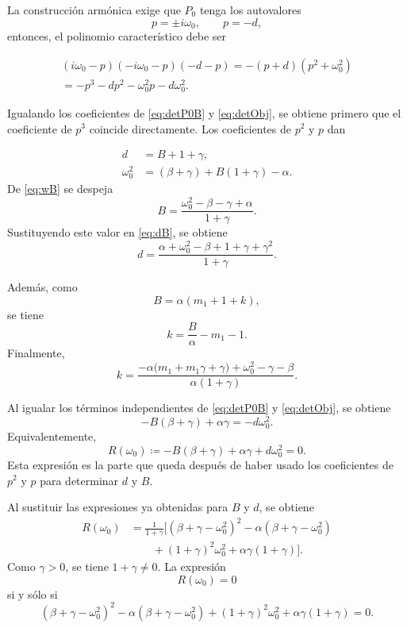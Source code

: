 \documentclass[journal]{IEEEtran}
\begin{document}
\noindent La construcción armónica exige que \(P_0\) tenga los autovalores
\[
p=\pm i\omega_0,\qquad p=-d,
\]
entonces, el polinomio característico debe ser

\begin{eqnarray}
(i\omega_0-p)(-i \omega_0 -p)(-d-p)=-(p+d)(p^2+\omega_0^2)\\
=-p^3-dp^2-\omega_0^2p-d\omega_0^2.
\label{eq:detObj}
\end{eqnarray}

\noindent Igualando los coeficientes de \eqref{eq:detP0B} y \eqref{eq:detObj}, se obtiene primero que el coeficiente de \(p^3\) coincide directamente. Los coeficientes de \(p^2\) y \(p\) dan

\begin{align}
d&=B+1+\gamma, \label{eq:dB}\\
\omega_0^2&=(\beta+\gamma)+B(1+\gamma)-\alpha. \label{eq:wB}
\end{align}
De \eqref{eq:wB} se despeja
\[
B=
\frac{\omega_0^2-\beta-\gamma+\alpha}{1+\gamma}.
\]
Sustituyendo este valor en \eqref{eq:dB}, se obtiene
\begin{equation}
d=
\frac{\alpha+\omega_0^2-\beta+1+\gamma+\gamma^2}{1+\gamma}.
\end{equation}

Además, como
\[
B=\alpha(m_1+1+k),
\]
se tiene
\[
k=\frac{B}{\alpha}-m_1-1.
\]
Finalmente,
\begin{equation}
k=
\frac{-\alpha\bigl(m_1+m_1\gamma+\gamma\bigr)
+\omega_0^2-\gamma-\beta}{\alpha(1+\gamma)}.
\end{equation}

\noindent Al igualar los términos independientes de \eqref{eq:detP0B} y \eqref{eq:detObj}, se obtiene
\[
-B(\beta+\gamma)+\alpha\gamma=-d\omega_0^2.
\]
Equivalentemente,
\[
R(\omega_0)
\coloneqq
-B(\beta+\gamma)+\alpha\gamma+d\omega_0^2=0.
\]
Esta expresión  es la parte que queda después de haber usado los coeficientes de \(p^2\) y \(p\) para determinar \(d\) y \(B\).

Al sustituir las expresiones ya obtenidas para \(B\) y \(d\), se obtiene
\begin{equation}
\begin{aligned}
R(\omega_0)
&=
\frac{1}{1+\gamma}
\Big[
(\beta+\gamma-\omega_0^2)^2
-\alpha(\beta+\gamma-\omega_0^2)
\\
&\qquad
+(1+\gamma)^2\omega_0^2
+\alpha\gamma(1+\gamma)
\Big].
\end{aligned}
\end{equation}
Como \(\gamma>0\), se tiene \(1+\gamma\neq 0\). La expresión
\[
R(\omega_0)=0
\]
si y sólo si
\begin{equation}
(\beta+\gamma-\omega_0^2)^2
-\alpha(\beta+\gamma-\omega_0^2)
+(1+\gamma)^2\omega_0^2
+\alpha\gamma(1+\gamma)=0.
\end{equation}
\end{document}
